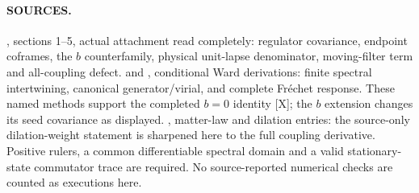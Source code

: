 \paragraph*{SOURCES.}
\begingroup\footnotesize
{},
sections 1--5, actual attachment read completely: regulator covariance,
endpoint coframes, the $b$ counterfamily, physical unit-lapse
denominator, moving-filter term and all-coupling defect.
and
,
conditional Ward derivations: finite spectral intertwining,
canonical generator/virial, and complete Fr\'echet response.
These named methods support the completed $b=0$ identity [X];
the $b$ extension changes its seed covariance as displayed.
,
matter-law and dilation entries: the source-only dilation-weight
statement is sharpened here to the full coupling derivative.
Positive rulers, a common differentiable spectral domain and a valid
stationary-state commutator trace are required.
No source-reported numerical checks are counted as executions here.
\endgroup
